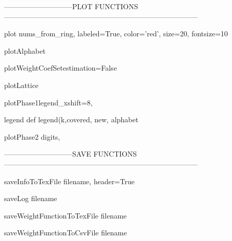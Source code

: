 -----------------------------PLOT FUNCTIONS---------------------------------------------------------------------------------

\begin{method}{plot}{ nums\_from\_ring, labeled=True, color='red', size=20, fontsize=10}

\end{method}


\begin{method}{plotAlphabet}{}

\end{method}


\begin{method}{plotWeightCoefSet}{estimation=False}

\end{method}


\begin{method}{plotLattice}{}

\end{method}


\begin{method}{plotPhase1}{legend\_xshift=8,}

\end{method}


\begin{method}{legend}{    def legend(k,covered, new, alphabet}

\end{method}


\begin{method}{plotPhase2}{ digits,}

\end{method}


-----------------------------SAVE FUNCTIONS---------------------------------------------------------------------------------

\begin{method}{saveInfoToTexFile}{ filename, header=True}

\end{method}


\begin{method}{saveLog}{ filename}

\end{method}


\begin{method}{saveWeightFunctionToTexFile}{ filename}

\end{method}


\begin{method}{saveWeightFunctionToCsvFile}{ filename}

\end{method}


